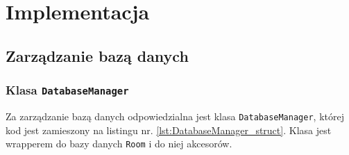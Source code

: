 \section{Implementacja}		%

\subsection{Zarządzanie bazą danych}

\subsubsection{Klasa \texttt{DatabaseManager}} \label{sec:DatabaseManager}

Za zarządzanie bazą danych odpowiedzialna jest klasa \texttt{DatabaseManager}, której kod jest zamieszony na listingu nr. \ref{lst:DatabaseManager_struct}. Klasa jest wrapperem do bazy danych \texttt{Room}\cite{doc_room} i do niej akcesorów.

